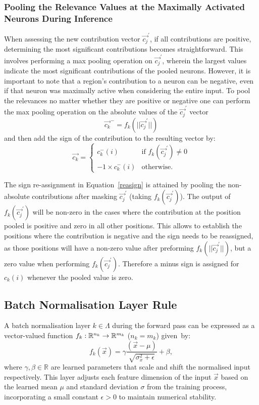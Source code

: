 \subsubsection{Pooling the Relevance Values at the Maximally Activated Neurons During Inference}

When assessing the new contribution vector \(\vec{c_j}^\prime\), if all contributions are positive, determining the most significant contributions becomes straightforward. This involves performing a max pooling operation on \(\vec{c_j}^\prime\), wherein the largest values indicate the most significant contributions of the pooled neurons. However, it is important to note that a region's contribution to a neuron can be negative, even if that neuron was maximally active when considering the entire input. To pool the relevances no matter whether they are positive or negative one can perform the max pooling operation on the absolute values of the $\vec{c_j}^\prime$ vector 
\begin{equation}
    \label{pool}
    \vec{c_{k}}^- = f_{k}(||\vec{c_j}^\prime||)
\end{equation}
and then add the sign of the contribution to the resulting vector by:
\begin{equation}
    \label{reasign}
    \vec{c_{k}} = \begin{cases}
    c_{k}^-(i) & \mbox{if $f_{k}(\vec{c_j}^\prime)\not=0$}\\
    -1\times c_{k}^-(i)& \mbox{otherwise}.
    \end{cases}
\end{equation}

The sign re-assignment in Equation~\ref{reasign} is attained by pooling the non-absolute contributions after masking $\vec{c_j}^\prime$ (\ie taking $f_{k}(\vec{c_j}^\prime)$). The output of $f_{k}(\vec{c_j}^\prime)$ will be non-zero in the cases where the contribution at the position pooled is positive and zero in all other positions. This allows to establish the positions where the contribution is negative and the sign needs to be reassigned, as those positions will have a non-zero value after preforming $f_{k}(||\vec{c_j}^\prime||)$, but a zero value when performing $f_{k}(\vec{c_j}^\prime)$. Therefore a minus sign is assigned for $c_{k}(i)$ whenever the pooled value is zero.


\subsection{Batch Normalisation Layer Rule}
A batch normalisation layer $k\in \Lambda$ during the forward pass can be expressed as a vector-valued function $f_k:\mathbb{R}^{n_k}\to \mathbb{R}^{m_k}$ ($n_k=m_k$) given~by:
\begin{equation*}
    f_k(\vec{x}) = \gamma \frac{(\vec{x}-\mu)}{\sqrt{\sigma_x^2 +\epsilon}} + \beta ,
\end{equation*}
where $\gamma,\beta \in \mathbb{R}$ are learned parameters that scale and shift the normalised input respectively. This layer adjusts each feature dimension of the input \(\vec{x}\) based on the learned mean \(\mu\) and standard deviation \(\sigma\) from the training process, incorporating a small constant \(\epsilon > 0\) to maintain numerical stability.

